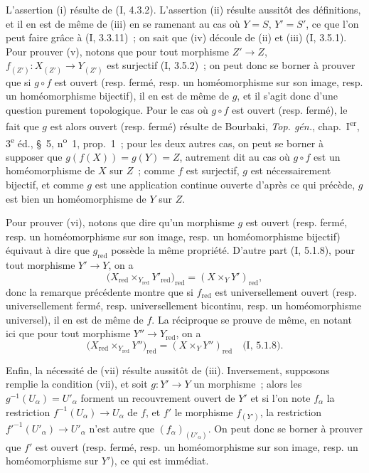 L'assertion (i) résulte de (I, 4.3.2). L'assertion (ii) résulte aussitôt des
définitions, et il en est de même de (iii) en se ramenant au cas où $Y=S$,
$Y'=S'$, ce que l'on peut faire grâce à (I, 3.3.11)~; on sait que (iv)
découle de (ii) et (iii) (I, 3.5.1). Pour prouver (v), notons que pour tout
morphisme $Z'\to Z$, $f_{(Z')}:X_{(Z')}\to Y_{(Z')}$ est surjectif
(I, 3.5.2)~; on peut donc se borner à prouver que si $g\circ f$ est ouvert
(resp. fermé, resp. un
homéomorphisme sur son image, resp. un homéomorphisme bijectif), il en est de
même de $g$, et il s'agit donc d'une question purement topologique. Pour le
cas où $g\circ f$ est ouvert (resp. fermé), le fait que $g$ est alors ouvert
(resp. fermé) résulte de Bourbaki, \emph{Top. gén.}, chap.~I\textsuperscript{er},
3\textsuperscript{e} éd., \S~5, n\textsuperscript{o}~1, prop.~1~; pour les
deux autres cas, on peut se borner à supposer que
$g(f(X))=g(Y)=Z$, autrement dit au cas où $g\circ f$ est un homéomorphisme de
$X$ sur $Z$~; comme $f$ est surjectif, $g$ est nécessairement bijectif, et
comme $g$ est une application continue ouverte d'après ce qui précède, $g$
est bien un homéomorphisme de $Y$ sur $Z$.

Pour prouver (vi), notons que dire qu'un morphisme $g$ est ouvert (resp.
fermé, resp. un homéomorphisme sur son image, resp. un homéomorphisme
bijectif) équivaut à dire que $g_{\mathrm{red}}$ possède la même propriété.
D'autre part (I, 5.1.8), pour tout morphisme $Y'\to Y$, on a
\[
\bigl(X_{\mathrm{red}}\times_{Y_{\mathrm{red}}}Y'_{\mathrm{red}}\bigr)_{\mathrm{red}}
=(X\times_Y Y')_{\mathrm{red}},
\]
donc la remarque précédente montre que si $f_{\mathrm{red}}$ est
universellement ouvert (resp. universellement fermé, resp. universellement
bicontinu, resp. un homéomorphisme universel), il en est de même de $f$. La
réciproque se prouve de même, en notant ici que pour tout morphisme
$Y''\to Y_{\mathrm{red}}$, on a
\[
\bigl(X_{\mathrm{red}}\times_{Y_{\mathrm{red}}}Y''\bigr)_{\mathrm{red}}
=(X\times_Y Y'')_{\mathrm{red}}
\quad\text{(I, 5.1.8).}
\]

Enfin, la nécessité de (vii) résulte aussitôt de (iii). Inversement, supposons
remplie la condition (vii), et soit $g:Y'\to Y$ un morphisme~; alors les
$g^{-1}(U_\alpha)=U'_\alpha$ forment un recouvrement ouvert de $Y'$ et si
l'on note $f_\alpha$ la restriction $f^{-1}(U_\alpha)\to U_\alpha$ de $f$,
et $f'$ le morphisme $f_{(Y')}$, la restriction
$f'^{-1}(U'_\alpha)\to U'_\alpha$ n'est autre que
$(f_\alpha)_{(U'_\alpha)}$. On peut donc se borner à prouver que $f'$ est
ouvert (resp. fermé, resp. un homéomorphisme sur son image, resp. un
homéomorphisme sur $Y'$), ce qui est immédiat.

